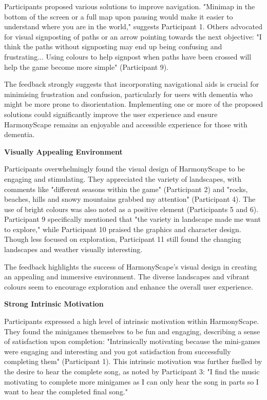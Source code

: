 \documentclass{l4proj}
\begin{document}
Participants proposed various solutions to improve navigation. "Minimap in the bottom of the screen or a full map upon pausing would make it easier to understand where you are in the world," suggests Participant 1.  Others advocated for visual signposting of paths or an arrow pointing towards the next objective:  "I think the paths without signposting may end up being confusing and frustrating... Using colours to help signpost when paths have been crossed will help the game become more simple" (Participant 9).

The feedback strongly suggests that incorporating navigational aids is crucial for minimising frustration and confusion, particularly for users with dementia who might be more prone to disorientation. Implementing one or more of the proposed solutions could significantly improve the user experience and ensure HarmonyScape remains an enjoyable and accessible experience for those with dementia.
\newline

\textbf{Visually Appealing Environment}

Participants overwhelmingly found the visual design of HarmonyScape to be engaging and stimulating. They appreciated the variety of landscapes, with comments like "different seasons within the game" (Participant 2) and "rocks, beaches, hills and snowy mountains grabbed my attention" (Participant 4). The use of bright colours was also noted as a positive element (Participants 5 and 6).  Participant 9 specifically mentioned that "the variety in landscape made me want to explore," while Participant 10 praised the graphics and character design. Though less focused on exploration, Participant 11 still found the changing landscapes and weather visually interesting.

The feedback highlights the success of HarmonyScape's visual design in creating an appealing and immersive environment. The diverse landscapes and vibrant colours seem to encourage exploration and enhance the overall user experience.
\newline

\textbf{Strong Intrinsic Motivation}

Participants expressed a high level of intrinsic motivation within HarmonyScape. They found the minigames themselves to be fun and engaging, describing a sense of satisfaction upon completion: "Intrinsically motivating because the mini-games were engaging and interesting and you got satisfaction from successfully completing them" (Participant 1). This intrinsic motivation was further fuelled by the desire to hear the complete song, as noted by Participant 3: "I find the music motivating to complete more minigames as I can only hear the song in parts so I want to hear the completed final song."
\end{document}
